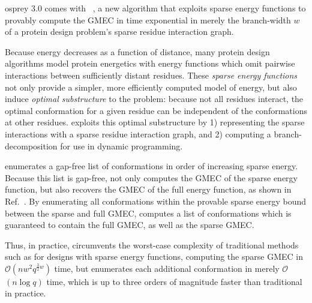 \def\Oh{$\mathcal{O}$}

{\sc osprey} 3.0 comes with {\bwmstar}~\cite{BWM*}, a new algorithm that exploits sparse energy functions to provably compute the GMEC in time exponential in merely the branch-width $w$ of a protein design problem's sparse residue interaction graph.

Because energy decreases as a function of distance, many protein design algorithms model protein energetics with energy functions which omit pairwise interactions between sufficiently distant residues. These \emph{sparse energy functions} not only provide a simpler, more efficiently computed model of energy, but also induce \emph{optimal substructure} to the problem: because not all residues interact, the optimal conformation for a given residue can be independent of the conformations at other residues. {\bwmstar} exploits this optimal substructure by 1) representing the sparse interactions with a sparse residue interaction graph, and 2) computing a branch-decomposition for use in dynamic programming. 

{\bwmstar} enumerates a gap-free list of conformations in order of increasing sparse energy. Because this list is gap-free, {\bwmstar} not only computes the GMEC of the sparse energy function, but also recovers the GMEC of the full energy function, as shown in Ref.~. By enumerating all conformations within the provable sparse energy bound between the sparse and full GMEC, {\bwmstar} computes a list of conformations which is guaranteed to contain the full GMEC, as well as the sparse GMEC.

Thus, in practice, {\bwmstar} circumvents the worst-case complexity of traditional methods such as \as for designs with sparse energy functions, computing the sparse GMEC in \Oh$(nw^2q^{\frac{3}{2}w})$ time, but enumerates each additional conformation in merely \Oh$(n\log q)$ time, which is up to three orders of magnitude faster than traditional \as in practice.